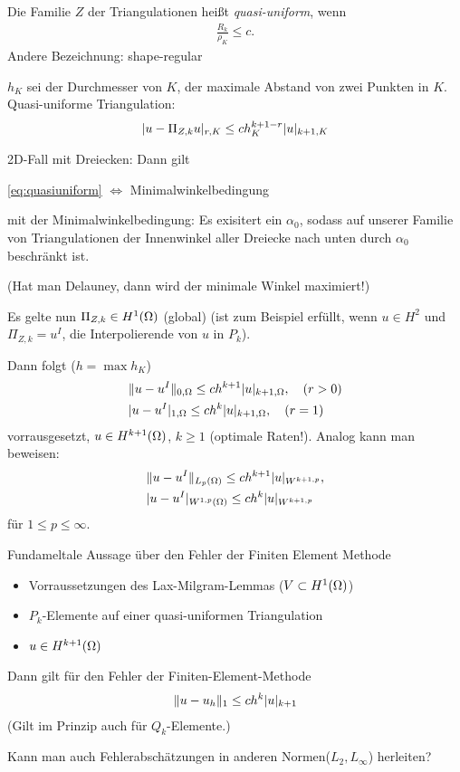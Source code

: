 \begin{definition}
  Die Familie $Z$ der Triangulationen heißt \emph{quasi-uniform}, wenn 
  \begin{align}\label{eq:quasiuniform}
    \frac {R_k}{\rho_K} \leq c.
  \end{align}
Andere Bezeichnung: shape-regular
\end{definition}
$h_K$ sei der Durchmesser von $K$, der maximale Abstand von zwei Punkten in $K$. Quasi-uniforme Triangulation:
\begin{align*}
  |u - \Pi_{Z, k}u|_{r, K} \leq c h_K^{k+1-r} |u|_{k+1, K}
\end{align*}
\begin{beispiel}
2D-Fall mit Dreiecken: Dann gilt

\begin{center}

  \eqref{eq:quasiuniform} $\Leftrightarrow$ Minimalwinkelbedingung
\end{center}


mit der Minimalwinkelbedingung: Es exisitert ein $\alpha_0$, sodass auf unserer Familie von Triangulationen der Innenwinkel aller Dreiecke nach unten durch $\alpha_0$ beschränkt ist.

(Hat man Delauney, dann wird der minimale Winkel maximiert!)
\end{beispiel}
Es gelte nun $\Pi_{Z, k} \in H^1(\Omega)$ (global) (ist zum Beispiel erfüllt, wenn $u \in H^2$ und $\Pi_{Z, k} = u^I$, die Interpolierende von $u$ in $P_k$).

Dann folgt ($h = \max h_K$)
\begin{align*}
&  \|u - u^I\|_{0,\Omega} \leq c h^{k+1} |u|_{k+1, \Omega}, \quad (r > 0)\\
&  |u - u^I|_{1, \Omega} \leq c h^k|u|_{k+1, \Omega}, \quad (r = 1)
\end{align*}
vorrausgesetzt, $u \in H^{k+1}(\Omega)$, $k \geq 1$ (optimale Raten!).
Analog kann man beweisen:
\begin{align*}
  &  \|u - u^I\|_{L_p(\Omega)} \leq c h^{k+1} |u|_{W^{k+1, p}},\\
&  |u - u^I|_{W^{1, p}(\Omega)} \leq c h^k|u|_{W^{k+1, p}}
\end{align*}
für $1 \leq p \leq \infty$.
\begin{satz} Fundameltale Aussage über den Fehler der Finiten Element Methode
  \begin{itemize}
  \item Vorraussetzungen des Lax-Milgram-Lemmas ($V \subset H^1(\Omega)$)
  \item $P_k$-Elemente auf einer quasi-uniformen Triangulation
  \item $u \in H^{k+1}(\Omega)$
  \end{itemize}
Dann gilt für den Fehler der Finiten-Element-Methode
\begin{align*}
  \|u - u_h\|_{1} \leq c h^k|u|_{k+1}
\end{align*}
(Gilt im Prinzip auch für $Q_k$-Elemente.)
\end{satz}
Kann man auch Fehlerabschätzungen in anderen Normen($L_2, L_\infty$) herleiten? 
